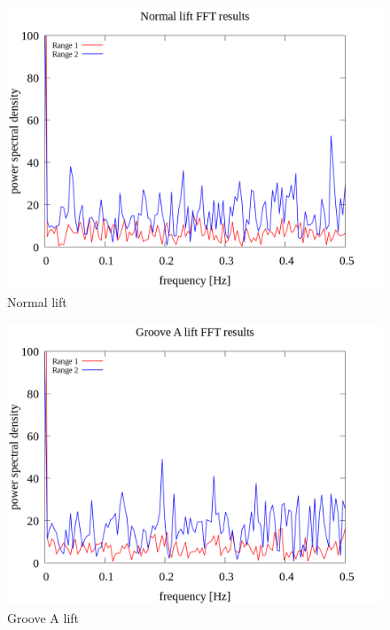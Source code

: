 \documentclass[a4paper]{jsarticle}
\begin{document}
\begin{figure}[htbp]
    \footnotesize
    \begin{center}
        \includegraphics[width=130mm]{../images/Normal_lift_08.png}
        \caption{Normal lift}
    \end{center}
\end{figure}

\begin{figure}[htbp]
    \footnotesize
    \begin{center}
        \includegraphics[width=130mm]{../images/Groove_A_lift_08.png}
        \caption{Groove A lift}
    \end{center}
\end{figure}
\end{document}
